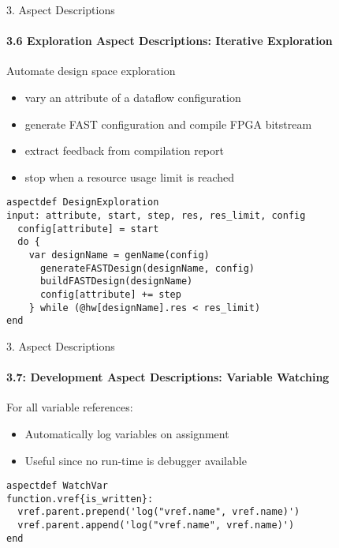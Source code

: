 \begin{frame}[fragile]{3. Aspect Descriptions}
  \framesubtitle{3.6 Exploration Aspect Descriptions: Iterative Exploration}
  Automate design space exploration
  \begin{itemize}
  \item vary an attribute of a dataflow configuration
  \item generate FAST configuration and compile FPGA bitstream
  \item extract feedback from compilation report
  \item stop when a resource usage limit is reached
  \end{itemize}
  \begin{lstlisting}[label=lst:label, style=lara]
aspectdef DesignExploration
input: attribute, start, step, res, res_limit, config
  config[attribute] = start
  do {
    var designName = genName(config)
      generateFASTDesign(designName, config)
      buildFASTDesign(designName)
      config[attribute] += step
    } while (@hw[designName].res < res_limit)
end
  \end{lstlisting}
\end{frame}

\begin{frame}[fragile]{3. Aspect Descriptions}
  \framesubtitle{3.7: Development Aspect Descriptions: Variable Watching}
  For all variable references:
  \begin{itemize}
  \item Automatically log variables on assignment
  \item Useful since no run-time is debugger available
  \end{itemize}
  \begin{lstlisting}[label=lst:label, style=lara]
aspectdef WatchVar
function.vref{is_written}:
  vref.parent.prepend('log("vref.name", vref.name)')
  vref.parent.append('log("vref.name", vref.name)')
end
  \end{lstlisting}
\end{frame}
